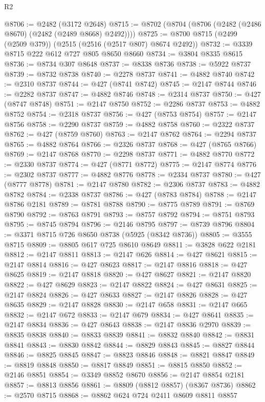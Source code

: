 \begin{lexlean}{R2}
\begin{coremodule}
@8706 := @2482 (@3172 @2648)
@8715 := @8702 (@8704 (@8706 (@2482 (@2486 @8670) (@2482 (@2489 @8668) @2492))))
@8725 := @8700 @8715 (@2499 (@2509 @379)) (@2515 (@2516 (@2517 @807) @8674 @2492))
@8732 := @3339 @8715 @222 @612 @727 @805 @8650 @8660
@8734 := @3804 @8335 @8615
@8736 := @8734 @307 @8648
@8737 := @8338 @8736
@8738 := @5922 @8737
@8739 := @8732 @8738
@8740 := @2278 @8737
@8741 := @4882 @8740
@8742 := @2310 @8737
@8744 := @427 (@8741 @8742)
@8745 := @2147 @8744
@8746 := @2282 @8737
@8747 := @4882 @8746
@8748 := @2314 @8737
@8750 := @427 (@8747 @8748)
@8751 := @2147 @8750
@8752 := @2286 @8737
@8753 := @4882 @8752
@8754 := @2318 @8737
@8756 := @427 (@8753 @8754)
@8757 := @2147 @8756
@8758 := @2290 @8737
@8759 := @4882 @8758
@8760 := @2322 @8737
@8762 := @427 (@8759 @8760)
@8763 := @2147 @8762
@8764 := @2294 @8737
@8765 := @4882 @8764
@8766 := @2326 @8737
@8768 := @427 (@8765 @8766)
@8769 := @2147 @8768
@8770 := @2298 @8737
@8771 := @4882 @8770
@8772 := @2330 @8737
@8774 := @427 (@8771 @8772)
@8775 := @2147 @8774
@8776 := @2302 @8737
@8777 := @4882 @8776
@8778 := @2334 @8737
@8780 := @427 (@8777 @8778)
@8781 := @2147 @8780
@8782 := @2306 @8737
@8783 := @4882 @8782
@8784 := @2338 @8737
@8786 := @427 (@8783 @8784)
@8788 := @2147 @8786 @2181
@8789 := @8781 @8788
@8790 := @8775 @8789
@8791 := @8769 @8790
@8792 := @8763 @8791
@8793 := @8757 @8792
@8794 := @8751 @8793
@8795 := @8745 @8794
@8796 := @2146 @8795
@8797 := @8739 @8796
@8804 := @3371 @8715 @726 @8650 @8738 (@5925 (@8342 @8736))
@8805 := @3555 @8715
@8809 := @8805 @617 @725 @8610 @8649
@8811 := @3828 @622 @2181
@8812 := @2147 @8811
@8813 := @2147 @626
@8814 := @427 @8621
@8815 := @2147 @8814
@8816 := @427 @8623
@8817 := @2147 @8816
@8818 := @427 @8625
@8819 := @2147 @8818
@8820 := @427 @8627
@8821 := @2147 @8820
@8822 := @427 @8629
@8823 := @2147 @8822
@8824 := @427 @8631
@8825 := @2147 @8824
@8826 := @427 @8633
@8827 := @2147 @8826
@8828 := @427 @8635
@8829 := @2147 @8828
@8830 := @2147 @658
@8831 := @2147 @665
@8832 := @2147 @672
@8833 := @2147 @679
@8834 := @427 @8641
@8835 := @2147 @8834
@8836 := @427 @8643
@8838 := @2147 @8836 @2970
@8839 := @8835 @8838
@8840 := @8833 @8839
@8841 := @8832 @8840
@8842 := @8831 @8841
@8843 := @8830 @8842
@8844 := @8829 @8843
@8845 := @8827 @8844
@8846 := @8825 @8845
@8847 := @8823 @8846
@8848 := @8821 @8847
@8849 := @8819 @8848
@8850 := @8817 @8849
@8851 := @8815 @8850
@8852 := @2146 @8851
@8854 := @3349 @8852 @8670
@8856 := @2147 @8854 @2181
@8857 := @8813 @8856
@8861 := @8809 (@8812 @8857) (@8367 @8736)
@8862 := @2570 @8715
@8868 := @8862 @624 @724 @2411 @8609 @8811 @8857

\end{coremodule}
\end{lexlean}
